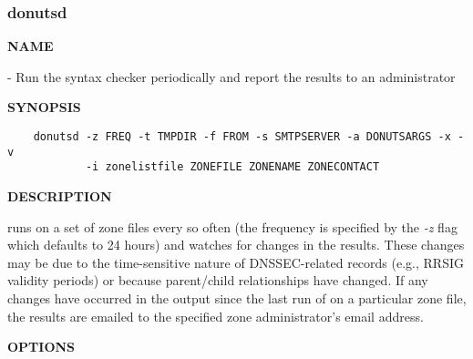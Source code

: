 \clearpage

\subsubsection{\bf donutsd}


{\bf NAME}

 - Run the  syntax checker periodically and report the
results to an administrator

{\bf SYNOPSIS}

\begin{verbatim}
    donutsd -z FREQ -t TMPDIR -f FROM -s SMTPSERVER -a DONUTSARGS -x -v
            -i zonelistfile ZONEFILE ZONENAME ZONECONTACT
\end{verbatim}

{\bf DESCRIPTION}

 runs  on a set of zone files every so often (the
frequency is specified by the {\it -z} flag which defaults to 24 hours) and
watches for changes in the results.  These changes may be due to the
time-sensitive nature of DNSSEC-related records (e.g., RRSIG validity periods)
or because parent/child relationships have changed.  If any changes have
occurred in the output since the last run of  on a particular zone
file, the results are emailed to the specified zone administrator's email
address.

{\bf OPTIONS}


